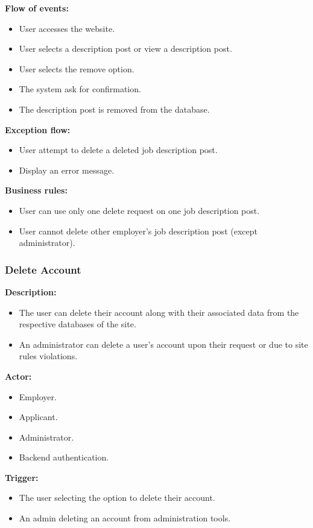 \documentclass[a4paper]{article}
\begin{document}
\textbf{Flow of events:}
\begin{itemize}
    \item User accesses the website.
    \item User selects a description post or view a description post.
    \item User selects the remove option.
    \item The system ask for confirmation.
    \item The description post is removed from the database.
\end{itemize}

\textbf{Exception flow:}
\begin{itemize}
    \item User attempt to delete a deleted job description post.
    \item Display an error message.
\end{itemize}

\textbf{Business rules:}
\begin{itemize}
    \item User can use only one delete request on one job description post.
    \item User cannot delete other employer's job description post (except administrator).
\end{itemize}

\subsubsection{Delete Account}
\textbf{Description:}
\begin{itemize}
    \item The user can delete their account along with their associated data from the respective databases of the site.
    \item An administrator can delete a user's account upon their request or due to site rules violations.
\end{itemize}

\textbf{Actor:}
\begin{itemize}
    \item Employer.
    \item Applicant.
    \item Administrator.
    \item Backend authentication.
\end{itemize}

\textbf{Trigger:}
\begin{itemize}
    \item The user selecting the option to delete their account.
    \item An admin deleting an account from administration tools.
\end{itemize}
\end{document}
